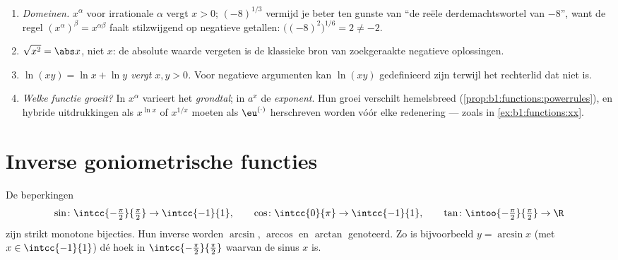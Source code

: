 \begin{remark}\label{rem:b1:functions:pitfalls}
\begin{enumerate}
  \item \emph{Domeinen.} $x^\alpha$ voor irrationale $\alpha$ vergt $x
        > 0$; $(-8)^{1/3}$ vermijd je beter ten gunste van ``de reële
        derdemachtswortel van $-8$'', want de regel $(x^\alpha)^\beta =
        x^{\alpha\beta}$ faalt stilzwijgend op negatieve getallen:
        $\bigl((-8)^2\bigr)^{1/6} = 2 \neq -2$.
  \item \emph{$\sqrt{x^2} = \abs x$}, niet $x$: de absolute waarde
        vergeten is de klassieke bron van zoekgeraakte negatieve
        oplossingen.
  \item \emph{$\ln(xy) = \ln x + \ln y$ vergt $x, y > 0$.} Voor
        negatieve argumenten kan $\ln(xy)$ gedefinieerd zijn terwijl
        het rechterlid dat niet is.
  \item \emph{Welke functie groeit?} In $x^\alpha$ varieert het
        \emph{grondtal}; in $a^x$ de \emph{exponent}. Hun groei
        verschilt hemelsbreed (\cref{prop:b1:functions:powerrules}), en
        hybride uitdrukkingen als $x^{\ln x}$ of $x^{1/x}$ moeten als
        $\eu^{(\cdot)}$ herschreven worden vóór elke redenering ---
        zoals in \cref{ex:b1:functions:xx}.
\end{enumerate}
\end{remark}

\section{Inverse goniometrische functies}

\begin{definition}[$\arcsin$, $\arccos$, $\arctan$]\label{def:b1:functions:arc}
De beperkingen
\[
\sin \colon \intcc{-\tfrac\pi2}{\tfrac\pi2} \to \intcc{-1}{1},
\qquad
\cos \colon \intcc{0}{\pi} \to \intcc{-1}{1},
\qquad
\tan \colon \intoo{-\tfrac\pi2}{\tfrac\pi2} \to \R
\]
zijn strikt monotone bijecties. Hun inverse  worden
$\arcsin$, $\arccos$ en
$\arctan$ genoteerd. Zo is bijvoorbeeld $y = \arcsin
x$ (met $x \in \intcc{-1}{1}$) dé hoek in
$\intcc{-\frac\pi2}{\frac\pi2}$ waarvan de sinus $x$ is.
\end{definition}

